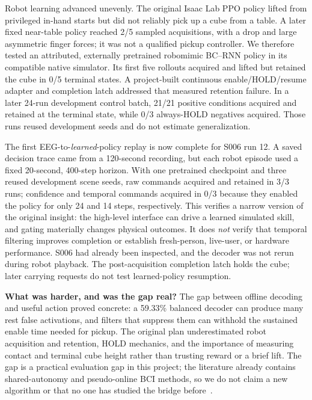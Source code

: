 \documentclass[11pt]{article}
\begin{document}
Robot learning advanced unevenly. The original Isaac Lab PPO policy lifted from privileged in-hand starts but did not reliably pick up a cube from a table. A later fixed near-table policy reached 2/5 sampled acquisitions, with a drop and large asymmetric finger forces; it was not a qualified pickup controller. We therefore tested an attributed, externally pretrained robomimic BC--RNN policy in its compatible native simulator. Its first five rollouts acquired and lifted but retained the cube in 0/5 terminal states. A project-built continuous enable/HOLD/resume adapter and completion latch addressed that measured retention failure. In a later 24-run development control batch, 21/21 positive conditions acquired and retained at the terminal state, while 0/3 always-HOLD negatives acquired. Those runs reused development seeds and do not estimate generalization.

The first EEG-to-\emph{learned}-policy replay is now complete for S006 run 12. A saved decision trace came from a 120-second recording, but each robot episode used a fixed 20-second, 400-step horizon. With one pretrained checkpoint and three reused development scene seeds, raw commands acquired and retained in 3/3 runs; confidence and temporal commands acquired in 0/3 because they enabled the policy for only 24 and 14 steps, respectively. This verifies a narrow version of the original insight: the high-level interface can drive a learned simulated skill, and gating materially changes physical outcomes. It does \emph{not} verify that temporal filtering improves completion or establish fresh-person, live-user, or hardware performance. S006 had already been inspected, and the decoder was not rerun during robot playback. The post-acquisition completion latch holds the cube; later carrying requests do not test learned-policy resumption.

\textbf{What was harder, and was the gap real?} The gap between offline decoding and useful action proved concrete: a 59.33\% balanced decoder can produce many rest false activations, and filters that suppress them can withhold the sustained enable time needed for pickup. The original plan underestimated robot acquisition and retention, HOLD mechanics, and the importance of measuring contact and terminal cube height rather than trusting reward or a brief lift. The gap is a practical evaluation gap in this project; the literature already contains shared-autonomy and pseudo-online BCI methods, so we do not claim a new algorithm or that no one has studied the bridge before~\citep{akinola2017,carrara2023}.
\end{document}
